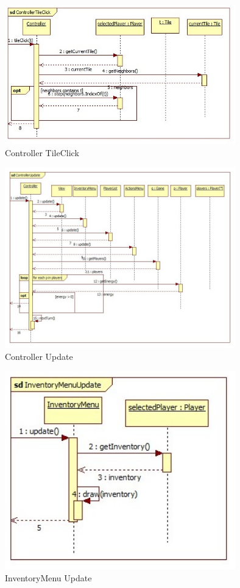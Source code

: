 \begin{figure}[H]
	\begin{center}
		\includegraphics[width=10cm]{chapters/chapter11/seq/Controller_TileClick.jpg}
		\caption{Controller TileClick}
		\label{Controller TileClick}
	\end{center}
\end{figure}
\begin{figure}[H]
	\begin{center}
		\includegraphics[width=10cm]{chapters/chapter11/seq/Controller_Update.jpg}
		\caption{Controller Update}
		\label{Controller Update}
	\end{center}
\end{figure}
\begin{figure}[H]
	\begin{center}
		\includegraphics[width=10cm]{chapters/chapter11/seq/InventoryMenu_Update.jpg}
		\caption{InventoryMenu Update}
		\label{InventoryMenu Update}
	\end{center}
\end{figure}
